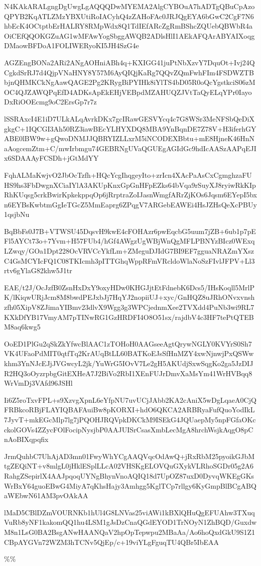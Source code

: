 \documentclass[]{article}
\newenvironment{Shaded}{\begin{snugshade}}{\end{snugshade}}
\newcommand{\NormalTok}[1]{#1}
\begin{document}
\begin{Shaded}
\begin{Highlighting}[]
\NormalTok{N4KAkARALgngDgUwgLgAQQQDwMYEMA2AlgCYBOuA7hADTgQBuCpAzoQPYB2KqATLZMzYBXUtiRoIACyhQ4zZAHoFAc0JRJQgEYA6bGwC2CgF7N6hbEcK4OCtptbErHALRY8RMpWdx8Q1TdIEfARcZgRmBShcZQUebQBWbR4aOiCEfQQOKGZuAG1wMFAwYogSbggAWQB2ADlsHlI1AEkAFQArABYAIXoqgDMaowBFDoA1FOLIWERyoKI5JH4SzG4e}

\NormalTok{AGZEngBONa2ARi2ANgAOHniABh4q+KXIGG41juPtNbXzvY7DquOt+Ivj24QCgkdSrRJ7d4QjpVNaHNY8Y57M6AyQIQjKaRg7QQvZQmFwhFIm4FSDWZTBbjnQHMKCkNgAawQAGE2Pg2KRygBiPYIHk8iYlTS4bD05R0oQcYgstkciS06zMOC4QJZAWQPqEfD4ADKsApEkEHjVEBpdMZAHUQZJVtTaQyELqYPr0IayoDxRiOOEcmg9oC2ErsGp7r7z}

\NormalTok{lSSRAxcI4E1iD7ULkALqAvrkDKx7gcIRawGESVYcq4c7G8WSr3MeNFSbQeDiXgkgC+1IQCGI3Ah50RZ3iawBEcYLHYXDQ8MBA9YnBqnDE7Z78V+H3iferhGYABE0lBW9w+gQwoDNMJJQBRYIZLLxrM5iNCODEXBbtu+mE8HjneK46HnNaAogcemZtm+C/mwIrbmgu74GEBRNgUVaQGUEgAGIdGc9hdIcAASzAAPqEJIx6SDAAAyFCSDh+jGtMdYY}

\NormalTok{FqhALMaKwjvO2JbOcTzfh+HQcYcgIhqgeyIto+zrIcn4XAcPaAsCxCgmghzaFUHS9hs3FbDwgnXCiaIYlA3AKUpKnxGpGnHFpEZks64bVqa9rSuyXJ8ryiwRkKIpRhKUqsg5crkBwirKpkekppqOp6jRrptraZoIJasnWmgfARrZjKOs6Jqsm6EYepI5bxn6EYBsKwbtmGgIeTGcZ5MmEaprg6ZPqgV7ARGebEAWEi4HsJZHsQeXcPBUy1qsjbNu}

\NormalTok{BqBbFs0J7B+VTWSU45DqsvH9kwE4cFOHAzr6pwEqcbG5uum7jZB+6ub1p7pEFl5AYCt73o+7Yvm+H57FUb4/hGf4AWgzUgWBjWnQgMFLPBNYzBIcz0WExqLZwqy/GOa1Dpt228OcVRVCcYkfLm+ZMeguDJIdG7BI9EF7gguaNRAZmYXszC4GsMCYIcFQ1C08TKIcmh3pITTGhqWppRFmVRcldoWlaNoSzFIvlJFPV+Ll3rtv6gYlaG82khw5J1tr}

\NormalTok{EAE/t2J/OcJzfB0ZsnHxDxY9oxyHDw0KHGJjtEtFdnebK6Dcs5/IHsKoqll5MrlPK/lKiqwURjJcm8M8bwdPEJxbJj7HqYJ2nopiiUJ+xyc/GnHQZ8uJRhONvxvnshzfh05XipV8ZJimaYIBmv23dlvX9Wgg3g3WPCjednmXee2TVXdd4PuNb3wi9RL7KXkDfYB17VmyAM7pTINwRG1GzHRDFI4O8O51sx/rajdbV4c3HF7tePtQTEBM8aq6kwg5}

\NormalTok{OoED1PlGu2qSkZkYfwcBlAAC1zTOHoH0AAGseeAgtQrywNGLY0KVYrS0Sh7VK4UFaoPdMIT0qtfTq2KrAUqBtLL60BATKoEJsSfHnMZY4xwNjnwjPxQSWwkhm3YnNJcEJjJVGwcyL2jk/YuWrG5IOvV7Le2gH5AKUdjSxwSqgKo2ga5JzDIJR2HQ3oOyzrpbgGitEXHeA7J2BiVo2RbI1XEnFUJrDmvXaMsYm41WrHVBqq8WrVmDj3VAfd96JSHl}

\NormalTok{Ii6Z5roTxvFPL+s9XzvgXpnL6eYfpNU7uvUCjJAbb2KA2cAniX5wDgLqaeA0CjQFRBkcoRBjFLAYIQBAFAuiBw8pKORXI+hdO6QKCA2ARBRyaFufQuoYodIkL7JyvT+mkEGcMlp7lg7jPQOHJRQVpkDKCkM9ISEkG4JQUaepMy5npFGfaOKcckolGOVs4ZZycFOlFocipNysjbP0AAJUISrCsasXmbLecMgA8hrchWsjkAqgO8pCnAoBIXqpqfix}

\NormalTok{JrmQuhbC7UhAjAD3mn01FwyWhYCgAAQVqcOdAwQ+jRxRbM25pyoikGJbMtgZEQiNT+v8mlgL0jHklESplLLcA02VHSKgELOVQuGXykVLRhoSGDr05g2A6RahgZSepirlX4AAJpqoqUYNgBhynVnoAQIQ18d7UpOZ87uxD0DyvqWKEgGKsWrBxY64guoEBwG4MiyA7qKhsHajy3Amhgg5KglTCp7rllgy6KyGmpBlBCgABQaWEbwN61AM3pvOAkAA}

\NormalTok{lMaD5CBlDZmVOURNKb1hUl4G8LNVas25viAWi1kBXlQHuQgEFUAhw3TXuqVuRb8yNF1kakomQQ1hu4LSM1gJsDzCnaQGdEYOD1TrNOyN1ZhBQD/GuxdwM8n1LsG0BA2BsgANwHAANQaV2hpOpTepwpu2MBaAa/Ao6hoQxdGkU9S1Z1CBpAYGVn72WZM3hTCNv5QjEp/c+19viYLgFguqTU4QBr5IbEAA}
\end{Highlighting}
\end{Shaded}

\%\%
\end{document}
